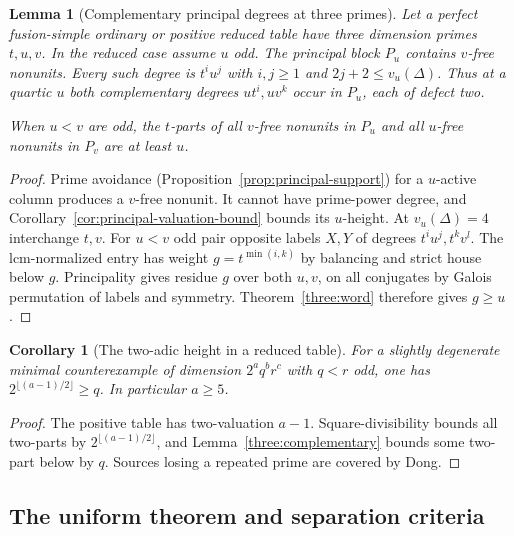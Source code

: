 \documentclass[11pt,a4paper]{article}
\numberwithin{equation}{section}
\newtheorem{lemma}[theorem]{Lemma}
\newtheorem{corollary}[theorem]{Corollary}
\theoremstyle{remark}
\begin{document}
\begin{lemma}[Complementary principal degrees at three primes]\label{fam:M:4.10}
\label{three:complementary}\label{prop:quartic-complementary-principal}
Let a perfect fusion-simple ordinary or positive reduced table have
three dimension primes $t,u,v$. In the reduced case assume $u$ odd.
The principal block $P_u$ contains $v$-free nonunits. Every such
degree is $t^iu^j$ with $i,j\ge1$ and
$2j+2\le v_u(\Delta)$. Thus at a quartic $u$ both complementary
degrees $ut^i,uv^k$ occur in $P_u$, each of defect two.

When $u<v$ are odd, the $t$-parts of all $v$-free nonunits in $P_u$
and all $u$-free nonunits in $P_v$ are at least $u$.
\end{lemma}
\begin{proof}
Prime avoidance (Proposition~\ref{prop:principal-support}) for a
$u$-active column produces a $v$-free nonunit. It cannot have
prime-power degree, and Corollary~\ref{cor:principal-valuation-bound}
bounds its $u$-height. At $v_u(\Delta)=4$ interchange $t,v$.
For $u<v$ odd pair opposite labels $X,Y$ of degrees
$t^iu^j,t^kv^l$. The lcm-normalized entry has weight
$g=t^{\min(i,k)}$ by balancing and strict house below $g$.
Principality gives residue $g$ over both $u,v$, on all conjugates
by Galois permutation of labels and symmetry. Theorem~\ref{three:word}
therefore gives $g\ge u$.
\end{proof}

\begin{corollary}[The two-adic height in a reduced table]\label{fam:M:4.11}
\label{prop:reduced-quartic-two-exclusion}
For a slightly degenerate minimal counterexample of dimension
$2^a q^b r^c$ with $q<r$ odd, one has
$2^{\lfloor(a-1)/2\rfloor}\ge q$. In particular $a\ge5$.
\end{corollary}
\begin{proof}
The positive table has two-valuation $a-1$. Square-divisibility
bounds all two-parts by $2^{\lfloor(a-1)/2\rfloor}$, and
Lemma~\ref{three:complementary} bounds some two-part below by $q$.
Sources losing a repeated prime are covered by Dong.
\end{proof}

\subsection{The uniform theorem and separation criteria}\label{fam:M:sec:4.4}
\end{document}

